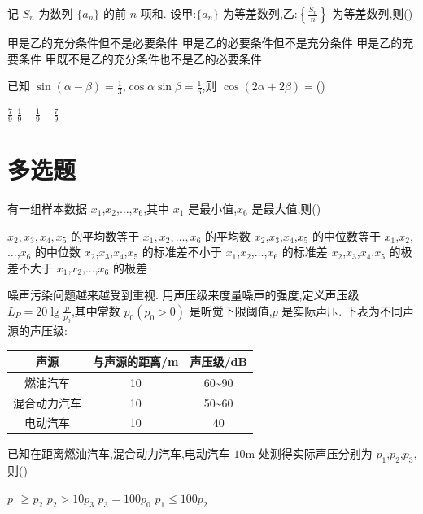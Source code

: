 \begin{problem}
记 \(S_n\) 为数列 \(\{a_n\}\) 的前 \(n\) 项和. 设甲:\(\{a_n\}\) 为等差数列,乙:\(\left\{\frac{S_n}{n}\right\}\) 为等差数列,则(\quad)

\choices
    {甲是乙的充分条件但不是必要条件}
    {甲是乙的必要条件但不是充分条件}
    {甲是乙的充要条件}
    {甲既不是乙的充分条件也不是乙的必要条件}
\end{problem}

\begin{problem}
已知 \(\sin(\alpha-\beta)=\frac13\),\(\cos\alpha\sin\beta=\frac16\),则 \(\cos(2\alpha+2\beta)=\)(\quad)

\choices
    {\(\frac79\)}
    {\(\frac19\)}
    {\(-\frac19\)}
    {\(-\frac79\)}
\end{problem}

\section{多选题}

\begin{problem}
有一组样本数据 \(x_1\),\(x_2\),\(\dots\),\(x_6\),其中 \(x_1\) 是最小值,\(x_6\) 是最大值,则(\quad)

\choices
    {\(x_2,x_3,x_4,x_5\) 的平均数等于 \(x_1,x_2,\dots,x_6\) 的平均数}
    {\(x_2\),\(x_3\),\(x_4\),\(x_5\) 的中位数等于 \(x_1\),\(x_2\),\(\dots\),\(x_6\) 的中位数}
    {\(x_2\),\(x_3\),\(x_4\),\(x_5\) 的标准差不小于 \(x_1\),\(x_2\),\(\dots\),\(x_6\) 的标准差}
    {\(x_2\),\(x_3\),\(x_4\),\(x_5\) 的极差不大于 \(x_1\),\(x_2\),\(\dots\),\(x_6\) 的极差}
\end{problem}

\begin{problem}
噪声污染问题越来越受到重视. 用声压级来度量噪声的强度,定义声压级 \(L_P=20\lg\frac{p}{p_0}\),其中常数 \(p_0(p_0>0)\) 是听觉下限阈值,\(p\) 是实际声压. 下表为不同声源的声压级:

\begin{center}
\begin{tabular}{|c|c|c|}
\hline
声源 & 与声源的距离/m & 声压级/dB \\
\hline
燃油汽车 & 10 & 60\textasciitilde90 \\
\hline
混合动力汽车 & 10 & 50\textasciitilde60 \\
\hline
电动汽车 & 10 & 40 \\
\hline
\end{tabular}
\end{center}

已知在距离燃油汽车,混合动力汽车,电动汽车 \(10\text{m}\) 处测得实际声压分别为 \(p_1\),\(p_2\),\(p_3\),则(\quad)

\choices
    {\(p_1\ge p_2\)}
    {\(p_2>10p_3\)}
    {\(p_3=100p_0\)}
    {\(p_1\le 100p_2\)}
\end{problem}

